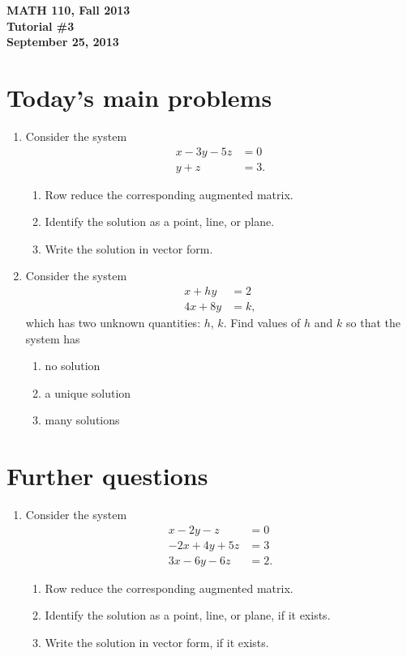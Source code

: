 \documentclass[11pt]{exam}
\newcommand{\mthCourse}{MATH 110}
\newcommand{\mthTerm}{Fall 2013}
\newcommand{\mthTutorialNumber}{3}
\newcommand{\mthDate}{September 25, 2013}
\begin{document}
{\large
	\begin{center}
		{\bf \mthCourse, \mthTerm}\\ 
		{\bf Tutorial \#\mthTutorialNumber}\\
		{\bf \mthDate}
	\end{center}
}

\section*{Today's main problems}

\begin{enumerate}
	\item Consider the system
	\begin{align*}
		x-3y-5z &= 0\\
		y+z &= 3.
	\end{align*}
	\begin{enumerate}
		\item Row reduce the corresponding augmented matrix.
		\item Identify the solution as a point, line, or plane.
		\item Write the solution in vector form.
	\end{enumerate}
	\item Consider the system
	\begin{align*}
		x+hy &= 2\\
		4x+8y &= k,
	\end{align*}
	which has two unknown quantities: $h$, $k$.  Find values of $h$ and
	$k$ so that the system has
	\begin{enumerate}
		\item no solution
		\item a unique solution
		\item many solutions
	\end{enumerate}
\end{enumerate}


\section*{Further questions}

\begin{enumerate}[resume]
	\item  Consider the system
	\begin{align*}
		x-2y-z &=0\\
		-2x+4y+5z &=3\\
		3x-6y-6z &=2.
	\end{align*}
	\begin{enumerate}
		\item Row reduce the corresponding augmented matrix.
		\item Identify the solution as a point, line, or plane, if it exists.
		\item Write the solution in vector form, if it exists.
	\end{enumerate}
\end{enumerate}
\end{document}
